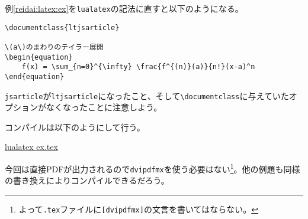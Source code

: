 例\ref{reidai:latex:ex}を\texttt{lualatex}の記法に直すと以下のようになる。

\begin{reidai}
    \label{reidai:latex:exlua}
    \begin{verbatim}
\documentclass{ltjsarticle}

\(a\)のまわりのテイラー展開
\begin{equation}
    f(x) = \sum_{n=0}^{\infty} \frac{f^{(n)}(a)}{n!}(x-a)^n
\end{equation}

\end{verbatim}
\end{reidai} \noindent

\texttt{jsarticle}が\texttt{ltjsarticle}になったこと、そして\texttt{\textbackslash documentclass}に与えていたオプションがなくなったことに注意しよう。

コンパイルは以下のようにして行う。

\begin{commandline2}
    \prompt \underline{lualatex ex.tex}
\end{commandline2} \noindent

今回は直接PDFが出力されるので\texttt{dvipdfmx}を使う必要はない\footnote{よって\texttt{.tex}ファイルに\texttt{[dvipdfmx]}の文言を書いてはならない。}。他の例題も同様の書き換えによりコンパイルできるだろう。
